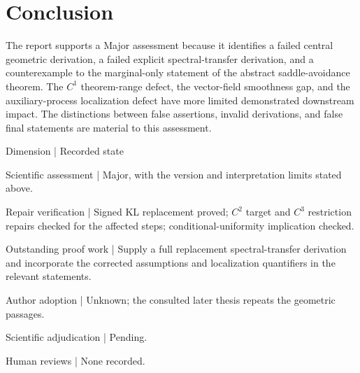 \documentclass[10pt]{article}
\begin{document}
\section*{Conclusion}
The report supports a Major assessment because it identifies a failed central geometric derivation, a failed explicit spectral-transfer derivation, and a counterexample to the marginal-only statement of the abstract saddle-avoidance theorem. The \(C^1\) theorem-range defect, the vector-field smoothness gap, and the auxiliary-process localization defect have more limited demonstrated downstream impact. The distinctions between false assertions, invalid derivations, and false final statements are material to this assessment.\par
Dimension | Recorded state\par
Scientific assessment | Major, with the version and interpretation limits stated above.\par
Repair verification | Signed KL replacement proved; \(C^2\) target and \(C^3\) restriction repairs checked for the affected steps; conditional-uniformity implication checked.\par
Outstanding proof work | Supply a full replacement spectral-transfer derivation and incorporate the corrected assumptions and localization quantifiers in the relevant statements.\par
Author adoption | Unknown; the consulted later thesis repeats the geometric passages.\par
Scientific adjudication | Pending.\par
Human reviews | None recorded.\par
\end{document}
